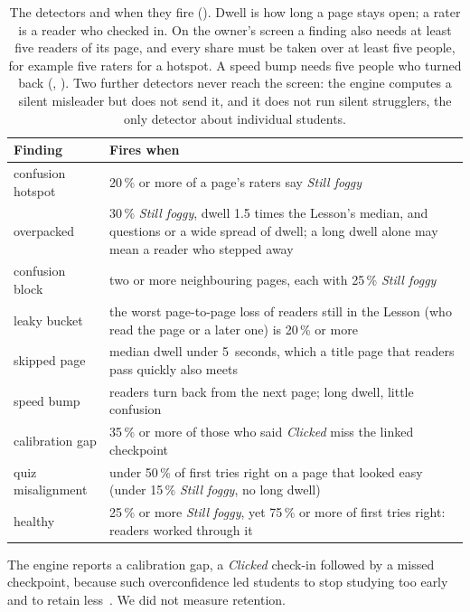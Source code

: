 \begin{table}[t]
  \centering
  \small
  \caption{The detectors and when they fire ().
    Dwell is how long a page stays open; a rater is a reader who checked in.
    On the owner's screen a finding also needs at least five readers of its
    page, and every share must be taken over at least five people, for example five
    raters for a hotspot. A speed bump needs five people who turned back
    (, ).
    Two further detectors never reach the screen: the engine computes a
    silent misleader but does not send it, and it does not run silent
    strugglers, the only detector about individual students.}
  \label{tab:detectors}
  \begin{tabular}{@{}lp{}@{}}
    \toprule
    Finding & Fires when \\
    \midrule
    confusion hotspot & 20\,\% or more of a page's raters say \emph{Still foggy} \\
    overpacked & 30\,\% \emph{Still foggy}, dwell 1.5 times the Lesson's median, and questions or a wide spread of dwell; a long dwell alone may mean a reader who stepped away \\
    confusion block & two or more neighbouring pages, each with 25\,\% \emph{Still foggy} \\
    leaky bucket & the worst page-to-page loss of readers still in the Lesson (who read the page or a later one) is 20\,\% or more \\
    skipped page & median dwell under 5~seconds, which a title page that readers pass quickly also meets \\
    speed bump & readers turn back from the next page; long dwell, little confusion \\
    calibration gap & 35\,\% or more of those who said \emph{Clicked} miss the linked checkpoint \\
    quiz misalignment & under 50\,\% of first tries right on a page that looked easy (under 15\,\% \emph{Still foggy}, no long dwell) \\
    healthy & 25\,\% or more \emph{Still foggy}, yet 75\,\% or more of first tries right: readers worked through it \\
    \bottomrule
  \end{tabular}
\end{table}

The engine reports a calibration gap, a \emph{Clicked} check-in followed by a
missed checkpoint, because such overconfidence led students to stop studying
too early and to retain less~\cite{dunlosky2012overconfidence}. We did not
measure retention.


